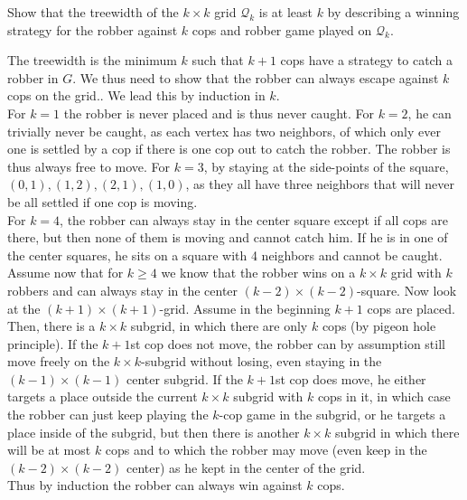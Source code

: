 \documentclass{article}
\begin{document}
\begin{exercise}
    Show that the treewidth of the $k\times k$ grid $\mathcal Q_k$ is at least $k$ by describing a winning strategy for the robber against $k$ cops and robber game played on $\mathcal Q_k$.
\end{exercise}
\begin{solving}
    The treewidth is the minimum $k$ such that $k+1$ cops have a strategy to catch a robber in $G$. We thus need to show that the robber can always escape against $k$ cops on the grid.. We lead this by induction in $k$.\\
    For $k=1$ the robber is never placed and is thus never caught. For $k=2$, he can trivially never be caught, as each vertex has two neighbors, of which only ever one is settled by a cop if there is one cop out to catch the robber. The robber is thus always free to move. For $k= 3$, by staying at the side-points of the square, $(0,1), (1,2), (2,1), (1,0)$, as they all have three neighbors that will never be all settled if one cop is moving.\\
    For $k=4$, the robber can always stay in the center square except if all cops are there, but then none of them is moving and cannot catch him. If he is in one of the center squares, he sits on a square with 4 neighbors and cannot be caught.\\
    Assume now that for $k\geq 4$ we know that the robber wins on a $k\times k$ grid with $k$ robbers and can always stay in the center $(k-2)\times(k-2)$-square. Now look at the $(k+1)\times (k+1)$-grid. Assume in the beginning $k+1$ cops are placed. Then, there is a $k\times k$ subgrid, in which there are only $k$ cops (by pigeon hole principle). If the $k+1$st cop does not move, the robber can by assumption still move freely on the $k\times k$-subgrid without losing, even staying in the $(k-1)\times(k-1)$ center subgrid. If the $k+1$st cop does move, he either targets a place outside the current $k\times k$ subgrid with $k$ cops in it, in which case the robber can just keep playing the $k$-cop game in the subgrid, or he targets a place inside of the subgrid, but then there is another $k\times k$ subgrid in which there will be at most $k$ cops and to which the robber may move (even keep in the $(k-2)\times (k-2)$ center) as he kept in the center of the grid.\\
    Thus by induction the robber can always win against $k$ cops.
\end{solving}
\end{document}
